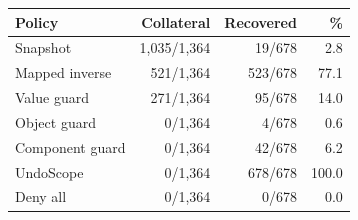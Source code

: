 \begin{tabular}{@{}lrrr@{}}\toprule Policy & Collateral & Recovered & \%\\\midrule
Snapshot & 1,035/1,364 & 19/678 & 2.8\\
Mapped inverse & 521/1,364 & 523/678 & 77.1\\
Value guard & 271/1,364 & 95/678 & 14.0\\
Object guard & 0/1,364 & 4/678 & 0.6\\
Component guard & 0/1,364 & 42/678 & 6.2\\
UndoScope & 0/1,364 & 678/678 & 100.0\\
Deny all & 0/1,364 & 0/678 & 0.0\\
\bottomrule\end{tabular}
